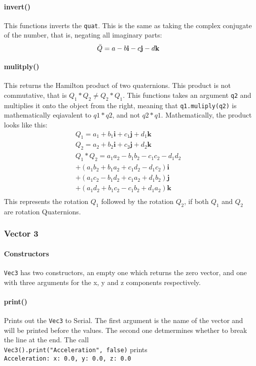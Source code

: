 \documentclass{article}
\begin{document}
\paragraph*{invert()}
This functions inverts the \verb|quat|. This is the same as taking the complex conjugate of the number, that is, negating all imaginary parts:
\begin{equation}
	\Bar{Q} = a - b\mathbf{i} - c\mathbf{j} - d\mathbf{k}
\end{equation}

\paragraph*{mulitply()}
This returns the Hamilton product of two quaternions. This product is not commutative, that is $Q_1*Q_2 \neq Q_2*Q_1$. This functions takes an argument \verb|q2| and multiplies
it onto the object from the right, meaning that \verb|q1.muliply(q2)| is mathematically eqiavalent to $q1*q2$, and not $q2*q1$. Mathematically, the product looks like this:
\begin{eqnarray*}
	Q_1 = a_1 + b_1\mathbf{i} + c_1\mathbf{j} + d_1\mathbf{k}\\
	Q_2 = a_2 + b_2\mathbf{i} + c_2\mathbf{j} + d_2\mathbf{k}\\
	Q_1*Q_2 = a_1a_2 -b_1b_2 - c_1c_2 - d_1d_2\\
			+ (a_1b_2 + b_1a_2 + c_1d_2 - d_1c_2)\mathbf{i}\\
			+ (a_1c_2 - b_1d_2 + c_1a_2 + d_1b_2)\mathbf{j}\\
			+ (a_1d_2 + b_1c_2 - c_1b_2 + d_1a_2)\mathbf{k}\\
\end{eqnarray*}
This represents the rotation $Q_1$ followed by the rotation $Q_2$, if both $Q_1$ and $Q_2$ are rotation Quaternions.

\subsubsection*{Vector 3}
\paragraph*{Constructors}
\verb|Vec3| has two constructors, an empty one which returns the zero vector, and one with three arguments for the x, y and z components respectively.

\paragraph*{print()}
Prints out the \verb|Vec3| to Serial. The first argument is the name of the vector and will be printed before the values. The second one detmermines whether to break the line
at the end. The call\\ 
\verb|Vec3().print("Acceleration", false)| prints \\
\verb|Acceleration: x: 0.0, y: 0.0, z: 0.0|
\end{document}
